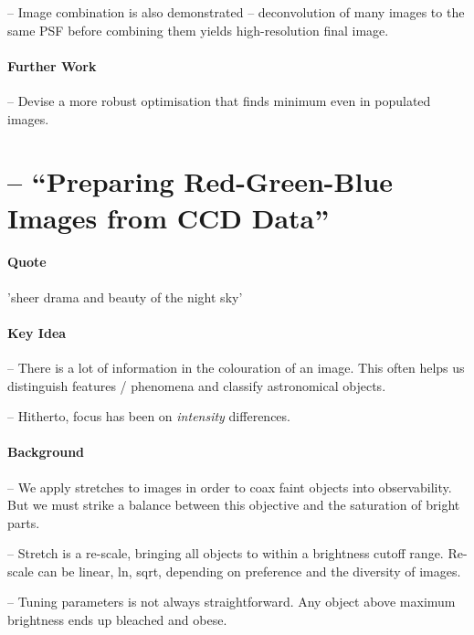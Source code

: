 \documentclass[letterpaper, 11pt]{article}
\begin{document}
-- Image combination is also demonstrated -- deconvolution of many images to the same PSF before combining them yields 
high-resolution final image.


\paragraph{Further Work}

-- Devise a more robust optimisation that finds minimum even in populated images.


\section{\citet{Lup++04} -- ``Preparing Red-Green-Blue Images from CCD Data''}
\label{sec:Lup++04notes}

\paragraph{Quote}

'sheer drama and beauty of the night sky'

\paragraph{Key Idea}

-- There is a lot of information in the colouration of an image. This often helps us distinguish features / phenomena and classify astronomical objects.

-- Hitherto, focus has been on {\it intensity} differences.


\paragraph{Background}

-- We apply stretches to images in order to coax faint objects into observability. But we must strike a balance between this objective and the saturation of bright parts.

-- Stretch is a re-scale, bringing all objects to within a brightness cutoff range. Re-scale can be linear, ln, sqrt, depending on preference and the diversity of images.

-- Tuning parameters is not always straightforward. Any object above maximum brightness ends up bleached and obese.
\end{document}
